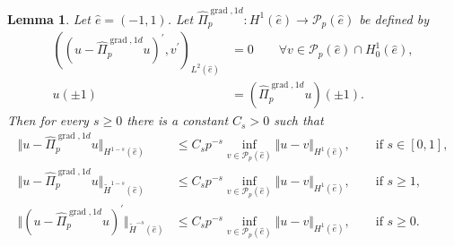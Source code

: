 \documentclass{article}
\newtheorem{lemma}[theorem]{Lemma}
\begin{document}
\begin{lemma}
\label{lemma:demkowicz-grad-1D} Let $\widehat{e}=(-1,1)$. 
Let $\widehat{\Pi}_p^{\operatorname*{grad},1d}:H^{1}(\widehat{e})\rightarrow{\mathcal{P}}_{p}(\widehat e)$ 
be defined by
\begin{subequations}
\label{eq:lemma:demkowicz-grad-1D-10}
\begin{align}
\label{eq:lemma:demkowicz-grad-1D-10-a}
((u-\widehat{\Pi}_p^{\operatorname*{grad},1d}u)^{\prime},v^{\prime})_{L^{2}(\widehat{e})}  &
=0\qquad\forall v\in{\mathcal{P}_{p}(\widehat e)}\cap H_{0}^{1}(\widehat{e}),\\
\label{eq:lemma:demkowicz-grad-1D-10-b}
u(\pm1)  &  =(\widehat{\Pi}_p^{\operatorname*{grad},1d}u)(\pm1).
\end{align}
\end{subequations}
Then for every $s\ge 0$ there is a constant $C_{s}>0$ such that 
\begin{subequations}
\begin{align}
\label{eq:lemma:demkowicz-grad-1D-20-a}
\Vert u-\widehat{\Pi}_p^{\operatorname*{grad},1d}u\Vert_{H^{1-s}(\widehat{e})}
&\leq C_{s} p^{-s} \inf_{v \in {\mathcal P}_p(\widehat e)} \Vert u - v\Vert_{H^{1}(\widehat{e})}, \qquad 
\mbox{if $s \in [0,1]$}, \\
\label{eq:lemma:demkowicz-grad-1D-20-b}
\Vert u-\widehat{\Pi}_p^{\operatorname*{grad},1d}u\Vert_{\widetilde H^{1-s}(\widehat{e})}
&\leq C_{s} p^{-s} \inf_{v \in {\mathcal P}_p(\widehat e)} \Vert u - v\Vert_{H^{1}(\widehat{e})}, \qquad 
\mbox{if $s \ge 1$}, \\
\label{eq:lemma:demkowicz-grad-1D-20-c}
\Vert (u-\widehat{\Pi}_p^{\operatorname*{grad},1d}u)^\prime\Vert_{\widetilde H^{-s}(\widehat{e})}
&\leq C_{s} p^{-s} \inf_{v \in {\mathcal P}_p(\widehat e)} \Vert u - v\Vert_{H^{1}(\widehat{e})}, \qquad 
\mbox{if $s \ge 0$}.
\end{align}
\end{subequations} 
\end{lemma}
\end{document}
